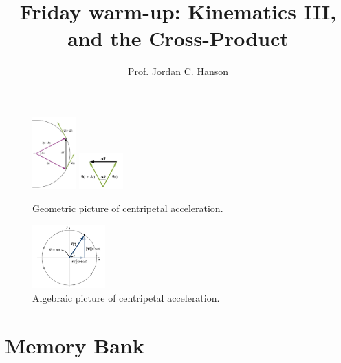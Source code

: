 \documentclass{article}
\begin{document}
\twocolumn

\title{Friday warm-up: Kinematics III, and the Cross-Product}
\author{Prof. Jordan C. Hanson}

\maketitle

\begin{figure}
\centering
\includegraphics[width=0.15\textwidth]{figures/circle1.png}
\includegraphics[width=0.15\textwidth]{figures/circle2.png}
\caption{\label{fig:1} Geometric picture of centripetal acceleration.}
\end{figure}

\begin{figure}
\centering
\includegraphics[width=0.25\textwidth]{figures/circular.png}
\caption{\label{fig:2} Algebraic picture of centripetal acceleration.}
\end{figure}

\section{Memory Bank}
\end{document}
